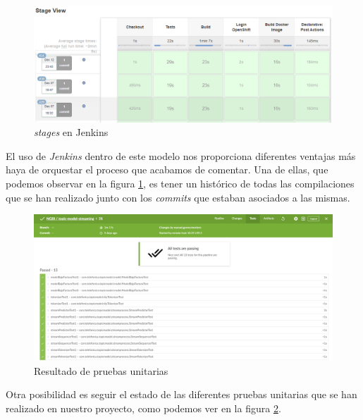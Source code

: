  

\begin{figure}[!ht]
	\centering
	\includegraphics[width=1\textwidth]{images/mant/jenkins-stages}
	\caption{\textit{stages} en Jenkins}
	\label{fig:jenkins}
\end{figure}

El uso de \textit{Jenkins} dentro de este modelo nos proporciona diferentes ventajas más haya de orquestar el proceso que acabamos de comentar. Una de ellas, que podemos observar en la figura \ref{fig:jenkins}, es tener un histórico de todas las compilaciones que se han realizado junto con los \textit{commits} que estaban asociados a las mismas. 


\begin{figure}[!ht]
	\centering
	\includegraphics[width=1\textwidth]{images/mant/tests_v2}
	\caption{Resultado de pruebas unitarias}
	\label{fig:jenkins-tests}
\end{figure}

Otra posibilidad es seguir el estado de las diferentes pruebas unitarias que se han realizado en nuestro proyecto, como podemos ver en la figura \ref{fig:jenkins-tests}.
